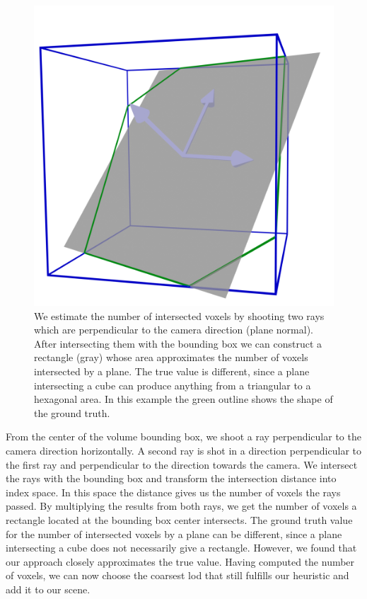 \begin{figure}[t]
    \centering
    \includegraphics[width=0.3\linewidth]{img/voxel_estimation.png}
    \caption[Estimation of intersected voxels]{We estimate the number of intersected voxels by shooting two rays which are perpendicular to the camera direction (plane normal). After intersecting them with the bounding box we can construct a rectangle (gray) whose area approximates the number of voxels intersected by a plane. The true value is different, since a plane intersecting a cube can produce anything from a triangular to a hexagonal area. In this example the green outline shows the shape of the ground truth.}
    \label{fig:voxel_estimation}
\end{figure}
From the center of the volume bounding box, we shoot a ray perpendicular to the camera direction horizontally.
A second ray is shot in a direction perpendicular to the first ray and perpendicular to the direction towards the camera.
We intersect the rays with the bounding box and transform the intersection distance into index space.
In this space the distance gives us the number of voxels the rays passed.
By multiplying the results from both rays, we get the number of voxels a rectangle located at the bounding box center intersects.
The ground truth value for the number of intersected voxels by a plane can be different, since a plane intersecting a cube does not necessarily give a rectangle.
However, we found that our approach closely approximates the true value.
Having computed the number of voxels, we can now choose the coarsest \ac{lod} that still fulfills our heuristic and add it to our scene.

